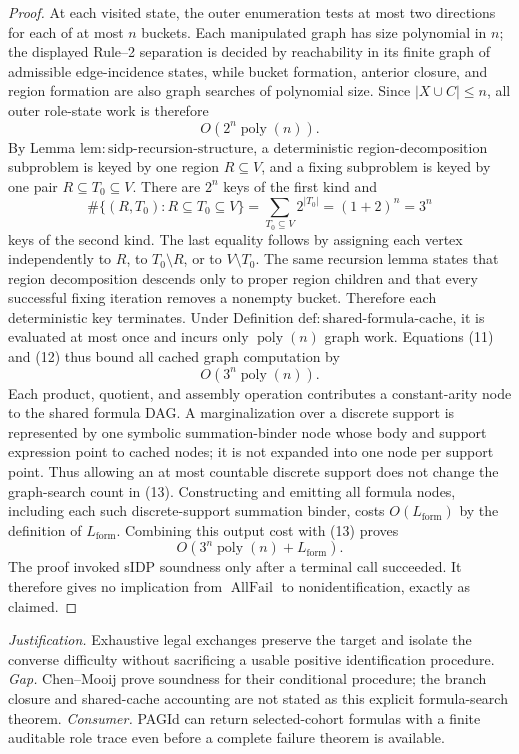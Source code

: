 \documentclass{article}
\begin{document}
\begin{proof}
At each visited state, the outer enumeration tests at most two directions for each of at most \(n\) buckets.  Each manipulated graph has size polynomial in \(n\); the displayed Rule--2 separation is decided by reachability in its finite graph of admissible edge-incidence states, while bucket formation, anterior closure, and region formation are also graph searches of polynomial size.  Since \(|X\cup C|\leq n\), all outer role-state work is therefore
\[
 O\!\left(2^n\operatorname{poly}(n)\right).
 \tag{11}
\]
By Lemma \(\mathrm{lem{:}sidp\text{-}recursion\text{-}structure}\), a deterministic region-decomposition subproblem is keyed by one region \(R\subseteq V\), and a fixing subproblem is keyed by one pair \(R\subseteq T_0\subseteq V\).  There are \(2^n\) keys of the first kind and
\[
 \#\{(R,T_0):R\subseteq T_0\subseteq V\}
 =\sum_{T_0\subseteq V}2^{|T_0|}
 =(1+2)^n=3^n
 \tag{12}
\]
keys of the second kind.  The last equality follows by assigning each vertex independently to \(R\), to \(T_0\setminus R\), or to \(V\setminus T_0\).  The same recursion lemma states that region decomposition descends only to proper region children and that every successful fixing iteration removes a nonempty bucket.  Therefore each deterministic key terminates.  Under Definition \(\mathrm{def{:}shared\text{-}formula\text{-}cache}\), it is evaluated at most once and incurs only \(\operatorname{poly}(n)\) graph work.  Equations (11) and (12) thus bound all cached graph computation by
\[
 O\!\left(3^n\operatorname{poly}(n)\right).
 \tag{13}
\]
Each product, quotient, and assembly operation contributes a constant-arity node to the shared formula DAG.  A marginalization over a discrete support is represented by one symbolic summation-binder node whose body and support expression point to cached nodes; it is not expanded into one node per support point.  Thus allowing an at most countable discrete support does not change the graph-search count in (13).  Constructing and emitting all formula nodes, including each such discrete-support summation binder, costs \(O(L_{\mathrm{form}})\) by the definition of \(L_{\mathrm{form}}\).  Combining this output cost with (13) proves
\[
 O\!\left(3^n\operatorname{poly}(n)+L_{\mathrm{form}}\right).
\]
The proof invoked sIDP soundness only after a terminal call succeeded.  It therefore gives no implication from \(\operatorname{AllFail}\) to nonidentification, exactly as claimed.
\end{proof}
\par\smallskip\noindent \textit{Justification.} Exhaustive legal exchanges preserve the target and isolate the converse difficulty without sacrificing a usable positive identification procedure. \textit{Gap.} Chen--Mooij prove soundness for their conditional procedure; the branch closure and shared-cache accounting are not stated as this explicit formula-search theorem. \textit{Consumer.} PAGId can return selected-cohort formulas with a finite auditable role trace even before a complete failure theorem is available.
\end{document}
